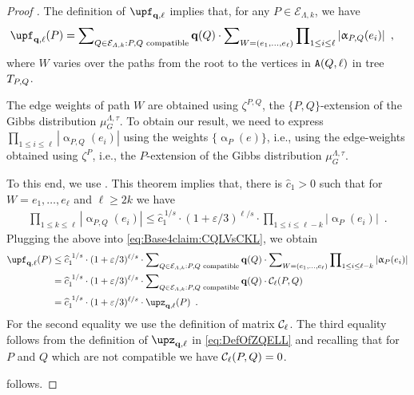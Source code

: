 \documentclass[11pt,reqno]{amsart}
\numberwithin{equation}{section}
\newcommand{\cE}{{\mathcal{E}}}
\newcommand{\applegreen}[1]{ {\color{applegreen}#1}}
\newcommand{\amethyst}[1]{{\color{amethyst}#1} }
\newcommand{\blue}[1]{{\color{blue}#1}}
\newcommand{\bluepigment}[1]{{\color{blue(pigment)}#1}}
\newcommand{\capri}[1]{{\color{capri}#1}}
\newcommand{\darkmagenta}[1]{{\color{darkmagenta}#1}}
\newcommand{\goldenbrown}[1]{{\color{goldenbrown}#1}}
\newcommand{\iris}[1]{{\color{iris}#1}}
\newcommand{\ExtV}{\iris{\cE}}
\newcommand{\pfs}{\darkmagenta{s}}
\newcommand{\cp}{{\tt A}}
\newcommand{\abs}[1]{\blue{|}#1\blue{|}}
\renewcommand{\applegreen}[1]{#1}
\renewcommand{\amethyst}[1]{#1}
\renewcommand{\blue}[1]{#1}
\renewcommand{\bluepigment}[1]{#1}
\renewcommand{\capri}[1]{#1}
\renewcommand{\darkmagenta}[1]{#1}
\renewcommand{\goldenbrown}[1]{#1}
\renewcommand{\iris}[1]{#1}
\newcommand{\ke}{\blue{e}}
\newcommand{\ki}{\capri{i}}
\newcommand{\kk}{\bluepigment{k}}
\newcommand{\kell}{{\color{green(pigment)}\ell}}%
\newcommand{\kP}{\goldenbrown{P}}
\newcommand{\kQ}{\amethyst{Q}}
\newcommand{\kW}{\blue{W}}
\renewcommand{\ke}{e}
\renewcommand{\ki}{i}
\renewcommand{\kk}{k}
\renewcommand{\kell}{\ell}
\renewcommand{\kP}{P}
\renewcommand{\kQ}{Q}
\renewcommand{\kW}{W}
\newcommand{\infweight}{\upalpha}
\begin{document}
\begin{proof}[Proof ]
The definition of $\vecF_{\vtest, \kell}$ implies that, for any $\kP \in \ExtV_{\Lambda,\kk}$, we have 
\begin{align}\label{eq:Base4claim:CQLVsCKL}
\vecF_{\vtest, \kell}(\kP)&=\sum\nolimits_{\kQ\in \ExtV_{\Lambda,\kk}: \kP,\kQ \textrm{ compatible}}\vtest(\kQ)\cdot \sum\nolimits_{\kW=(\ke_1, \ldots, \ke_{\kell})}
 \prod\nolimits_{1\leq \ki\leq \kell} \abs{\infweight_{\kP,\kQ}(\ke_{\ki})} \enspace,
\end{align}
where $\kW$ varies over the paths from the root to the vertices in $\cp(\kQ,\kell)$ in tree $\TPQ$.



The edge weights of path $\kW$  are obtained using $\zeta^{\kP,\kQ}$,   the $\{\kP,\kQ\}$-extension of
the Gibbs distribution $\mu^{\Lambda,\tau}_G$. 
%
To obtain our result, we need to express $ \prod\nolimits_{1\leq \ki\leq \kell} \abs{\infweight_{\kP,\kQ}(\ke_{\ki})}$
using the weights $\{\infweight_{\kP}(\ke)\}$, i.e., using the edge-weights obtained 
using $\zeta^{\kP}$, i.e.,   the $\kP$-extension of the Gibbs distribution $\mu^{\Lambda,\tau}_G$. 




To this end,  we  use    .  This theorem  implies that,  there is $\widehat{c}_1>0$ such that 
for $\kW=\ke_1, \ldots, \ke_{\kell}$ and $\kell\geq 2\kk$ we have
\begin{align}\nonumber
\prod\nolimits_{1\leq \kk\leq \kell} \abs{\infweight_{\kP,\kQ}(\ke_{\ki})}\leq \widehat{c}^{\ 1/\pfs}_1 \cdot (1+\varepsilon/3)^{\kell/\pfs} 
\cdot    \prod\nolimits_{1\leq \ki\leq \kell-\kk} \abs{ \infweight_{\kP}(\ke_{\ki})}\enspace.
\end{align}
Plugging the above into \eqref{eq:Base4claim:CQLVsCKL}, we obtain
%
\begin{align}\nonumber  
\vecF_{\vtest, \kell}(\kP) &\leq \widehat{c}^{\ 1/\pfs}_1 \cdot (1+\varepsilon/3)^{\kell/\pfs} 
\cdot \sum\nolimits_{\kQ\in\ExtV_{\Lambda,\kk}: \kP,\kQ\textrm{ compatible}}\vtest(\kQ)\cdot \sum\nolimits_{\kW=(\ke_1,\ldots, \ke_{\kell})}
 \prod\nolimits_{1\leq \ki\leq \kell-\kk} \abs{ \infweight_{\kP}(\ke_{\ki})}
 \\&
 = \widehat{c}^{\ 1/\pfs}_1 \cdot (1+\varepsilon/3)^{\kell/\pfs} 
\cdot \sum\nolimits_{\kQ\in\ExtV_{\Lambda,\kk}: \kP,\kQ\textrm{ compatible}}
\vtest(\kQ)\cdot \SimpleExtdInfMatrixL_{\kell}(\kP, \kQ) \nonumber
 \\ &
 =\widehat{c}^{\ 1/\pfs}_1\cdot (1+\varepsilon/3)^{\kell/\pfs} \cdot \SimpleFvec_{\vtest,\kell}(\kP) \nonumber
\enspace.
\end{align}
For the second equality we use the definition of matrix $\SimpleExtdInfMatrixL_{\kell}$.
The third equality follows from the definition of  $\SimpleFvec_{\vtest,\kell}$ in \eqref{eq:DefOfZQELL} and recalling  that for $\kP$ and $\kQ$ which
are not compatible we have $\SimpleExtdInfMatrixL_{\kell}(\kP, \kQ)=0$. 

 follows.
\end{proof}
\end{document}
